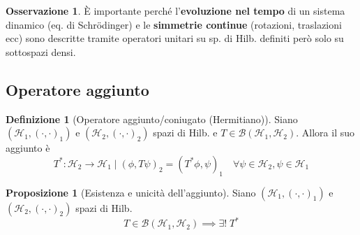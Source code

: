 \documentclass[a4paper,10pt]{article}
\theoremstyle{definition}
\theoremstyle{indentdefinition}
\newtheorem{defn}{Definizione}[section]
\theoremstyle{indenttheorem}
\newtheorem{prop}{Proposizione}
\theoremstyle{myremark}
\newtheorem*{rem*}{Osservazione}
\theoremstyle{indentgeneral}
\newenvironment{myboxed} 
{\noindent\begin{lrbox}{\mybox}\begin{minipage}{\textwidth}}
{\end{minipage}\end{lrbox}\fbox{\usebox{\mybox}}}
\begin{document}
\begin{rem*}
    È importante perché l'\textbf{evoluzione nel tempo} di un sistema dinamico (eq. di Schrödinger) e le \textbf{simmetrie continue} (rotazioni, traslazioni ecc) sono descritte tramite operatori unitari su sp. di Hilb. definiti però solo su sottospazi densi.
\end{rem*}

\subsection{Operatore aggiunto}
\begin{defn}[Operatore aggiunto/coniugato (Hermitiano)]
Siano $(\mathcal{H}_1,(\cdot,\cdot)_1)$ e $(\mathcal{H}_2,(\cdot,\cdot)_2)$ spazi di Hilb. e $T\in\mathcal{B}(\mathcal{H}_1,\mathcal{H}_2)$. Allora il suo aggiunto è 
$$T^*:\mathcal{H}_2\to \mathcal{H}_1\mid (\phi,T\psi)_2=(T^*\phi,\psi)_1 \quad \forall\psi\in\mathcal{H}_2,\psi\in\mathcal{H}_1$$
\end{defn}

\begin{myboxed}
\begin{prop}[Esistenza e unicità dell'aggiunto]
    Siano $(\mathcal{H}_1,(\cdot,\cdot)_1)$ e $(\mathcal{H}_2,(\cdot,\cdot)_2)$ spazi di Hilb. 
    $$T\in\mathcal{B}(\mathcal{H}_1,\mathcal{H}_2)\implies \exists!\; T^*$$
\end{prop}
\end{myboxed}
\end{document}
